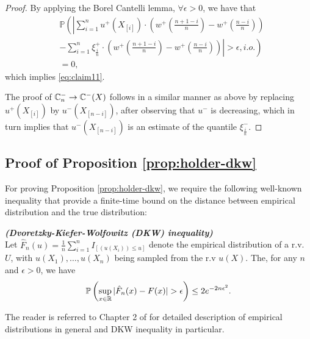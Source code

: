 \begin{proof}
By applying the Borel Cantelli lemma,  $\forall \epsilon >0$, we have that
\begin{align*}
&\mathbb{P} \left( \left| \sum_{i=1}^{n} u^+\left(X_{[i]}\right) \cdot \left(w^+\left(\frac{n+1-i}{n} \right)  - w^+\left(\frac{n-i}{n} \right) \right)\right.\right. \\
&\left.\left.-
\sum_{i=1}^{n} \xi^+_{\frac{i}{n}} \cdot \left(w^+\left(\frac{n+1-i}{n} \right)  - w^+\left(\frac{n-i}{n} \right) \right) \right| >
\epsilon , i.o.\right) \\
&=0, 
\end{align*}
which implies  \eqref{eq:claim11}. 

The proof of 
$\mathbb{C}_{n}^{-} \rightarrow \mathbb{C}^{-}(X)$ follows in a similar manner as above by replacing $u^+(X_{[i]})$ by $u^-(X_{[n-i]})$, after observing that $u^{-}$ is decreasing, which in turn implies that
$u^-(X_{[n-i]})$ is an estimate of the quantile $\xi^{-}_{\frac{i}{n}}$.
\end{proof}

\subsection*{Proof of Proposition \ref{prop:holder-dkw}}
For proving Proposition \ref{prop:holder-dkw}, we require the following well-known inequality that provide a finite-time bound on the distance between empirical distribution and the true distribution:
\begin{lemma}{\textbf{\textit{(Dvoretzky-Kiefer-Wolfowitz (DKW) inequality)}}}\\
Let ${\hat F_n}(u)=\frac{1}{n} \sum_{i=1}^n I_{\left[(u(X_i)) \leq u\right]}$ denote the empirical distribution of a r.v. $U$, with $u(X_1),\ldots,u(X_n)$ being sampled from the r.v $u(X)$.
The, for any $n$ and $\epsilon>0$, we have
$$
\Prob{\sup_{x\in \mathbb{R}}|\hat{F}_n(x)-F(x)|>\epsilon } \leq 2 e^{-2n\epsilon^2}.
$$
\end{lemma}

The reader is referred to Chapter 2 of \cite{wasserman2006} for detailed description of empirical distributions in general and DKW inequality in particular.

